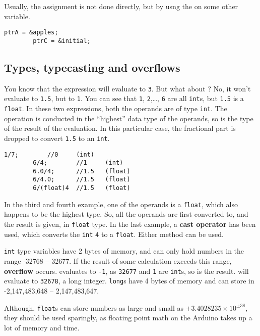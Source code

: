 \documentclass{article}
\begin{document}
		Usually, the assignment is not done directly, but by usng the \inlncd{\&} on some other variable.

		\begin{lstlisting}[gobble=8]
		ptrA = &apples;
		ptrC = &initial;
		\end{lstlisting}

	\subsection{Types, typecasting and overflows}

		You know that the expression  will evaluate to \texttt{3}. But what about ? No, it won't evaluate to \texttt{1.5}, but to \texttt{1}. You can see that \texttt{1}, \texttt{2},\ldots, \texttt{6} are all \texttt{int}s, but \texttt{1.5} is a \texttt{float}. In these two expressions, both the operands are of type \texttt{int}. The operation is conducted in the ``highest'' data type of the operands, so is the type of the result of the evaluation. In this particular case, the fractional part is dropped to convert \texttt{1.5} to an \texttt{int}.

		\begin{lstlisting}[gobble=8]
		1/7;		//0		(int)
		6/4;		//1		(int)
		6.0/4;		//1.5	(float)
		6/4.0;		//1.5	(float)
		6/(float)4	//1.5	(float)
		\end{lstlisting}

		In the third and fourth example, one of the operands is a \texttt{float}, which also happens to be the highest type. So, all the operands are first converted to, and the result is given, in \texttt{float} type. In the last example, a \textbf{cast operator} has been used, which converts the \texttt{int} \texttt{4} to a \texttt{float}. Either method can be used.

		\texttt{int} type variables have 2 bytes of memory, and can only hold numbers in the range -32768 -- 32677. If the result of some calculation exceeds this range, \textbf{overflow} occurs.  evaluates to \texttt{-1}, as \texttt{32677} and \texttt{1} are \texttt{int}s, so is the result.  will evaluate to \texttt{32678}, a long integer. \texttt{long}s have 4 bytes of memory and can store in -2,147,483,648 -- 2,147,483,647.

		Although, \texttt{float}s can store numbers as large and small as $\pm3.4028235\times10^{\pm38}$, they should be used sparingly, as floating point math on the Arduino takes up a lot of memory and time.
\end{document}
